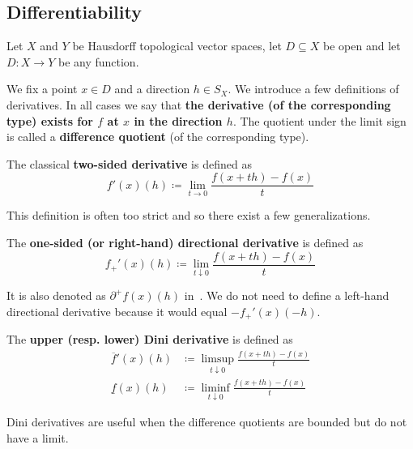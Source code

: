 \subsection{Differentiability}\label{subsec:differentiability}

Let \( X \) and \( Y \) be Hausdorff topological vector spaces, let \( D \subseteq X \) be open and let \( D: X \to Y \) be any function.

\begin{definition}\label{def:derivatives}
  We fix a point \( x \in D \) and a direction \( h \in S_X \). We introduce a few definitions of derivatives. In all cases we say that \textbf{the derivative (of the corresponding type) exists for \( f \) at \( x \) in the direction \( h \)}. The quotient under the limit sign is called a \textbf{difference quotient} (of the corresponding type).

  \begin{defenum}
     The classical \textbf{two-sided derivative} is defined as
    \begin{equation*}
      f'(x)(h) \coloneqq \lim_{t \to 0} \frac {f(x + th) - f(x)} t
    \end{equation*}

    This definition is often too strict and so there exist a few generalizations.

    \cite[lemma 1.2]{Phelps1993} The \textbf{one-sided (or right-hand) directional derivative} is defined as
    \begin{equation*}
      f_+'(x)(h) \coloneqq \lim_{t \downarrow 0} \frac {f(x + th) - f(x)} t
    \end{equation*}

    It is also denoted as \( \partial^+ f(x)(h) \) in~\cite[lemma 1.2]{Phelps1993}. We do not need to define a left-hand directional derivative because it would equal \( -f_+'(x)(-h) \).

    \cite[definition 11.18]{Clarke2013} The \textbf{upper (resp. lower) Dini derivative} is defined as
    \begin{align*}
      \overline f'(x)(h) &\coloneqq \limsup_{t \downarrow 0} \frac {f(x + th) - f(x)} t
      \\
      \underline f(x)(h) &\coloneqq \liminf_{t \downarrow 0} \frac {f(x + th) - f(x)} t
    \end{align*}

    Dini derivatives are useful when the difference quotients are bounded but do not have a limit.


\end{defenum}
\end{definition}

